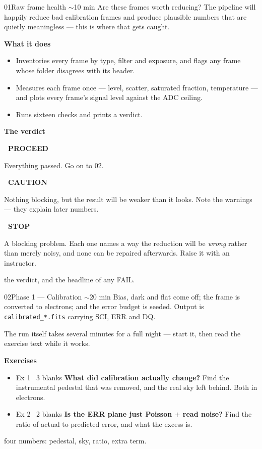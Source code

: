 \documentclass[11pt,a4paper]{article}
\newcommand{\verdict}[3]{%
  \noindent\colorbox{#1!14}{\textcolor{#1}{\sffamily\bfseries\scriptsize\ #2\ }}%
  \hspace{6pt}\begin{minipage}[t]{0.80\textwidth}\small #3\end{minipage}\par\vspace{5pt}}
\newcommand{\recordline}[2]{%
  \vspace{6pt}{\color{rule}\hrule}\vspace{6pt}%
  \noindent{\sffamily\bfseries\scriptsize\color{accent}\MakeUppercase{#1}}\hspace{6pt}%
  \begin{minipage}[t]{0.78\textwidth}\small #2\end{minipage}}
\begin{document}
\begin{nbbox}{01}{Raw frame health \quad\textnormal{\sffamily\scriptsize\color{inkfaint}$\sim$10 min}}
\small\color{inksoft} Are these frames worth reducing? The pipeline will happily reduce bad
calibration frames and produce plausible numbers that are quietly meaningless --- this is where
that gets caught.
\par\vspace{6pt}\color{ink}
{\sffamily\bfseries\small What it does}
\begin{itemize}
\item Inventories every frame by type, filter and exposure, and flags any frame whose folder
disagrees with its header.
\item Measures each frame once --- level, scatter, saturated fraction, temperature --- and plots
every frame's signal level against the ADC ceiling.
\item Runs sixteen checks and prints a verdict.
\end{itemize}
\vspace{6pt}
{\sffamily\bfseries\small The verdict}\par\vspace{5pt}
\verdict{pass}{PROCEED}{Everything passed. Go on to 02.}
\verdict{warn}{CAUTION}{Nothing blocking, but the result will be weaker than it looks. Note the
warnings --- they explain later numbers.}
\verdict{fail}{STOP}{A blocking problem. Each one names a way the reduction will be
\emph{wrong} rather than merely noisy, and none can be repaired afterwards. Raise it with an
instructor.}
\recordline{Record}{the verdict, and the headline of any FAIL.}
\end{nbbox}

\begin{nbbox}{02}{Phase 1 --- Calibration \quad\textnormal{\sffamily\scriptsize\color{inkfaint}$\sim$20 min}}
\small\color{inksoft} Bias, dark and flat come off; the frame is converted to electrons; and the
error budget is seeded. Output is \texttt{calibrated\_*.fits} carrying SCI, ERR and DQ.
\par\vspace{6pt}\color{ink}
The run itself takes several minutes for a full night --- start it, then read the exercise text
while it works.
\vspace{6pt}

{\sffamily\bfseries\small Exercises}
\begin{itemize}
\item[] {\ttfamily\scriptsize\color{inkfaint}Ex 1 \textbullet\ 3 blanks}\quad
\textbf{What did calibration actually change?} Find the instrumental pedestal that was removed,
and the real sky left behind. Both in electrons.
\item[] {\ttfamily\scriptsize\color{inkfaint}Ex 2 \textbullet\ 2 blanks}\quad
\textbf{Is the ERR plane just Poisson $+$ read noise?} Find the ratio of actual to predicted
error, and what the excess is.
\end{itemize}
\recordline{Record}{four numbers: pedestal, sky, ratio, extra term.}
\end{nbbox}
\end{document}
